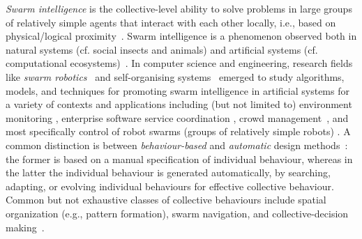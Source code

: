 

\emph{Swarm intelligence}
 is the collective-level ability to solve problems
 in large groups of relatively simple agents that interact with each other locally, i.e., based on physical/logical proximity~\cite{DBLP:books/daglib/0032898}.
%
Swarm intelligence is a phenomenon observed both in natural systems
 (cf. social insects and animals)
 and artificial systems
 (cf. computational ecosystems)~\cite{DBLP:books/daglib/0032898}.
%
In computer science and engineering,
 research fields
 like \emph{swarm robotics}~\cite{DBLP:journals/swarm/BrambillaFBD13} and self-organising systems~\cite{DBLP:series/ncs/2011SGK,DBLP:conf/saso/2007} emerged to
 study
 algorithms, models, and techniques
 for promoting swarm intelligence
 in artificial systems for a variety of contexts and applications including (but not limited to) environment monitoring \cite{demasi2020swarm-env-monitoring,DBLP:journals/fi/CasadeiPPVW20}, enterprise software service coordination \cite{DBLP:conf/saso/ClarkBP15}, crowd management~\cite{DBLP:journals/computer/BealPV15}, and most specifically control of robot swarms (groups of relatively simple robots) \cite{DBLP:journals/arobots/ShenWGC04,DBLP:journals/scirobotics/Carrillo-Zapata18}.
%
A common distinction is between \emph{behaviour-based} and \emph{automatic} design methods~\cite{DBLP:journals/swarm/BrambillaFBD13}: the former is based on a manual specification of individual behaviour, whereas in the latter the individual behaviour is generated automatically, by searching, adapting, or evolving individual behaviours for effective collective behaviour.
%
Common but not exhaustive classes of collective behaviours
 include spatial organization (e.g., pattern formation),
 swarm navigation,
 and collective-decision making~\cite{DBLP:journals/swarm/BrambillaFBD13}.
%

